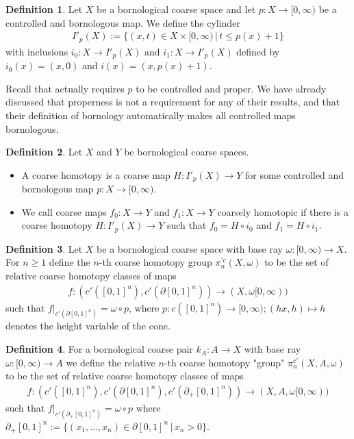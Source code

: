 \documentclass[a4paper,11pt]{article}
\theoremstyle{definition}
\newtheorem{definition}{Definition}[section]
\theoremstyle{plain}
\theoremstyle{remark}
\begin{document}
{\begin{definition} Let $X$ be a bornological coarse space and let $p: X\rightarrow \mathbb[0,\infty)$ be a controlled and bornologous map. We define the cylinder
\begin{align*}
I'_p(X) := \{(x,t)\in X \times [0,\infty)\,|\, t\leq p(x) +1\}
\end{align*}
with inclusions $i_0: X\rightarrow I'_p(X)$ and $i_1: X\rightarrow I'_p(X)$ defined by $i_0(x) = (x,0)$ and $i(x) = (x,p(x)+1)$. 
\end{definition}

Recall that \cite{mitchener2020coarse} actually requires $p$ to be controlled and proper. We have already discussed that properness is not a requirement for any of their results, and that their definition of bornology automatically makes all controlled maps bornologous. 

\begin{definition} Let $X$ and $Y$ be bornological coarse spaces. 
\begin{itemize}
\item A coarse homotopy is a coarse map $H: I'_p(X)\rightarrow Y$ for some controlled and bornologous map $p: X\rightarrow [0,\infty)$. 
\item We call coarse maps $f_0:X\rightarrow Y$ and $f_1: X\rightarrow Y$ coarsely homotopic if there is a coarse homotopy $H: I'_p(X)\rightarrow Y$ such that $f_0 = H\circ i_0$ and $f_1 = H\circ i_1$. 
\end{itemize}
\end{definition}

\begin{definition} Let $X$ be a bornological coarse space with base ray $\omega:[0,\infty)\rightarrow X$. For $n\geq 1$ define the $n$-th coarse homotopy group $\pi_n^{'c}(X,\omega)$ to be the set of relative coarse homotopy classes of maps 
\begin{align*}
f: (c'([0,1]^n), c'(\partial [0,1]^n))\rightarrow (X,\omega[0,\infty))
\end{align*}
such that $f|_{c'(\partial[0,1]^n)} = \omega \circ p$, where $p:c([0,1]^n)\rightarrow [0,\infty); (hx,h)\mapsto h$ denotes the height variable of the cone. 
\end{definition}

\begin{definition} 
For a bornological coarse pair $k_A: A\rightarrow X$ with base ray $\omega:[0,\infty)\rightarrow A$ we define the relative $n$-th coarse homotopy "group" $\pi_{n}^{c'}(X,A, \omega)$ to be the set of relative coarse homotopy classes of maps 
\begin{align*}
f: (c'([0,1]^n), c'(\partial [0,1]^n), c'(\partial_{+}[0,1]^n))\rightarrow (X,A,\omega[0,\infty))
\end{align*}
such that $f|_{c'(\partial_{+}[0,1]^n)}= \omega\circ p$ where $\partial_{+}[0,1]^n := \{(x_1,\dots,x_n)\in \partial [0,1]^n\,|\,x_n>0\}$. 
\end{definition}


}
\end{document}
